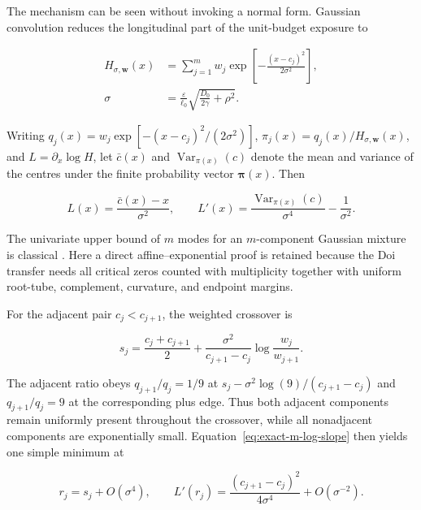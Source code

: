 The mechanism can be seen without invoking a normal form.  Gaussian
convolution reduces the longitudinal part of the unit-budget exposure to

\begin{equation}
 \begin{aligned}
  H_{\sigma,\bm w}(x)
  &=\sum_{j=1}^{m}w_j
    \exp\!\left[-\frac{(x-c_j)^2}{2\sigma^2}\right],\\
  \sigma&=\frac{\varepsilon}{\ell_0}
  \sqrt{\frac{D_0}{2\gamma}+\rho^2}.
 \end{aligned}
 \label{eq:exact-m-mixture}
\end{equation}

Writing $q_j(x)=w_j\exp[-(x-c_j)^2/(2\sigma^2)]$,
$\pi_j(x)=q_j(x)/H_{\sigma,\bm w}(x)$, and
$L=\partial_x\log H$, let $\bar c(x)$ and
$\operatorname{Var}_{\pi(x)}(c)$ denote the mean and variance of the centres
under the finite probability vector $\bm\pi(x)$.  Then

\begin{equation}
 L(x)=\frac{\bar c(x)-x}{\sigma^2},
 \qquad
 L'(x)=\frac{\operatorname{Var}_{\pi(x)}(c)}{\sigma^4}
       -\frac{1}{\sigma^2}.
 \label{eq:exact-m-log-slope}
\end{equation}

The univariate upper bound of $m$ modes for an $m$-component Gaussian mixture
is classical \cite{carreiraPerpinanWilliams2003modes,
amendolaEngstromHaase2020modes}.  Here a direct affine--exponential proof is
retained because the Doi transfer needs all critical zeros counted with
multiplicity together with uniform root-tube, complement, curvature, and
endpoint margins.

For the adjacent pair $c_j<c_{j+1}$, the weighted crossover is

\begin{equation}
 s_j=\frac{c_j+c_{j+1}}{2}
 +\frac{\sigma^2}{c_{j+1}-c_j}
  \log\!\frac{w_j}{w_{j+1}}.
 \label{eq:exact-m-crossover}
\end{equation}

The adjacent ratio obeys
$q_{j+1}/q_j=1/9$ at
$s_j-\sigma^2\log(9)/(c_{j+1}-c_j)$ and $q_{j+1}/q_j=9$ at the corresponding
plus edge.  Thus both adjacent components remain uniformly present throughout
the crossover, while all nonadjacent components are exponentially small.
Equation~\eqref{eq:exact-m-log-slope} then yields one simple minimum at

\begin{equation}
 r_j=s_j+O(\sigma^4),
 \qquad
 L'(r_j)=\frac{(c_{j+1}-c_j)^2}{4\sigma^4}
          +O(\sigma^{-2}).
 \label{eq:exact-m-valley}
\end{equation}

